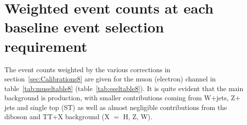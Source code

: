


\section{Weighted event counts at each baseline event selection requirement \label{cutflow}}

The event counts weighted by the various corrections in section~\ref{sec:Calibrations8} are given for the muon (electron) channel in table~\ref{tab:museltable8} (table~\ref{tab:eseltable8}). It is quite evident that the main background is \ttbar production, with smaller contributions coming from W$+$jets, Z$+$jets and single top (ST) as well as almost negligible contributions from the diboson and TT+X background (X $=$ H, Z, W).




